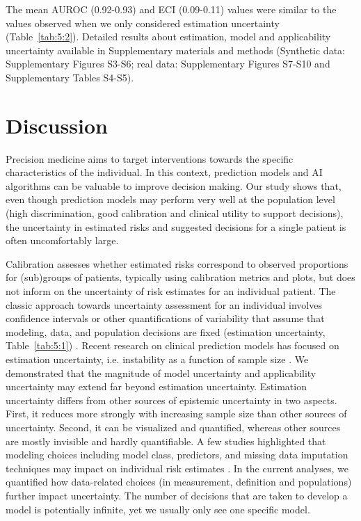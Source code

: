The mean \gls{AUROC} (0.92-0.93) and \gls{ECI} (0.09-0.11) values were similar to the values observed when we only considered estimation uncertainty (Table~\ref{tab:5:2}). Detailed results about estimation, model and applicability uncertainty available in Supplementary materials and methods (Synthetic data: Supplementary Figures S3-S6; real data: Supplementary Figures S7-S10 and Supplementary Tables S4-S5).

\section{Discussion}

Precision medicine aims to target interventions towards the specific characteristics of the individual. In this context, prediction models and \gls{AI} algorithms can be valuable to improve decision making. Our study shows that, even though prediction models may perform very well at the population level (high discrimination, good calibration and clinical utility to support decisions), the uncertainty in estimated risks and suggested decisions for a single patient is often uncomfortably large.

Calibration assesses whether estimated risks correspond to observed proportions for (sub)groups of patients, typically using calibration metrics and plots, but does not inform on the uncertainty of risk estimates for an individual patient. The classic approach towards uncertainty assessment for an individual involves confidence intervals or other quantifications of variability that assume that modeling, data, and population decisions are fixed (estimation uncertainty, Table~\ref{tab:5:1}) \cite{rileyStabilityClinicalPrediction2023,thomassenEffectiveSampleSize2024,kompaSecondOpinionNeeded2021}. Recent research on clinical prediction models has focused on estimation uncertainty, i.e. instability as a function of sample size \cite{rileyStabilityClinicalPrediction2023,rileyClinicalPredictionModels2023,rileyUncertaintyRiskEstimates2025}. We demonstrated that the magnitude of model uncertainty and applicability uncertainty may extend far beyond estimation uncertainty. Estimation uncertainty differs from other sources of epistemic uncertainty in two aspects. First, it reduces more strongly with increasing sample size than other sources of uncertainty. Second, it can be visualized and quantified, whereas other sources are mostly invisible and hardly quantifiable. A few studies highlighted that modeling choices including model class, predictors, and missing data imputation techniques may impact on individual risk estimates \cite{ledgerMulticlassRiskModels2023,pateUncertaintyUsingRisk2019,liConsistencyVarietyMachine2020}. In the current analyses, we quantified how data-related choices (in measurement, definition and populations) further impact uncertainty. The number of decisions that are taken to develop a model is potentially infinite, yet we usually only see one specific model.

